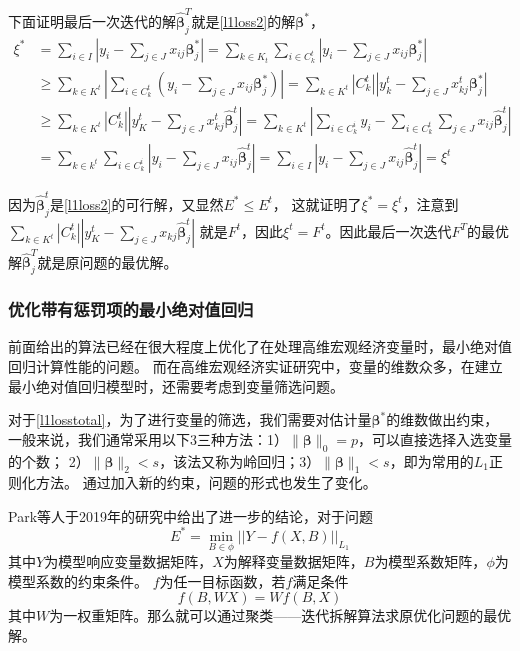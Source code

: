 下面证明最后一次迭代的解$\hat{\bm{\beta}}_j^T$就是\eqref{l1loss2}的解$\bm{\beta}^*$，
\begin{equation*}
    \begin{split}
        \xi^* & = \sum_{i \in I} |y_i - \sum_{j \in J}x_{ij}\bm{\beta}_j^*|
        = \sum_{k \in K_t}\sum_{i \in C_k^t}|y_i - \sum_{j \in J}x_{ij}\bm{\beta}_j^*| \\
        & \geq \sum_{k \in K^t}|\sum_{i\in C_k^t}(y_i - \sum_{j \in J}x_{ij}\bm{\beta}_j^*)|
        = \sum_{k \in K^t}|C_k^t||y_k^t - \sum_{j \in J}x_{kj}^t\bm{\beta}_j^*|\\
        & \geq \sum_{k \in K^t} |C_k^t||y_K^t - \sum_{j\in J}x_{kj}^t \hat{\bm{\beta}}_j^t|
        = \sum_{k \in K^t} |\sum_{i \in C_k^i} y_i - \sum_{i \in C_k^t}\sum_{j \in J}x_{ij}\hat{\bm{\beta}}_j^t| \\
        & = \sum_{k \in k^t} \sum_{i \in C_k^i}|y_i - \sum_{j \in J}x_{ij}\hat{\bm{\beta}}_j^t|
        = \sum_{i \in I}|y_i - \sum_{j \in J} x_{ij} \hat{\bm{\beta}}_j^t| 
        = \xi^t
    \end{split}
\end{equation*}

因为$\hat{\bm{\beta}}_j^t$是\eqref{l1loss2}的可行解，又显然$E^* \leq E^t$，
这就证明了$\xi^* = \xi^t$，注意到$ \sum_{k \in K^t} |C_k^t||y_K^t - \sum_{j\in J}x_{kj} \hat{\bm{\beta}}_j^t|$
就是$F^t$，因此$\xi^t = F^t$。因此最后一次迭代$F^T$的最优解$\hat{\bm{\beta}}_j^T$就是原问题的最优解。

\subsubsection{优化带有惩罚项的最小绝对值回归}
前面给出的算法已经在很大程度上优化了在处理高维宏观经济变量时，最小绝对值回归计算性能的问题。
而在高维宏观经济实证研究中，变量的维数众多，在建立最小绝对值回归模型时，还需要考虑到变量筛选问题。

对于\eqref{l1losstotal}，为了进行变量的筛选，我们需要对估计量$\bm{\beta}^*$的维数做出约束，
一般来说，我们通常采用以下3三种方法：1）$\|\bm{\beta}\|_0 = p$，可以直接选择入选变量的个数；
2）$\|\bm{\beta}\|_2 < s$，该法又称为岭回归；3）$\|\bm{\beta}\|_1 < s$，即为常用的$L_1$正则化方法。
通过加入新的约束，问题的形式也发生了变化。

Park等人于2019年的研究中给出了进一步的结论，对于问题
\begin{equation}\label{l1conclusion}
    E^* = \underset{B\in \phi}{\operatorname{min}} ||Y - f(X, B)||_{L_1}
\end{equation}
其中$Y$为模型响应变量数据矩阵，$X$为解释变量数据矩阵，$B$为模型系数矩阵，$\phi$为模型系数的约束条件。
$f$为任一目标函数，若$f$满足条件
\begin{equation}\label{fcondition}
    f(B, WX) = Wf(B, X)
\end{equation}
其中$W$为一权重矩阵。那么就可以通过聚类——迭代拆解算法求原优化问题的最优解。

